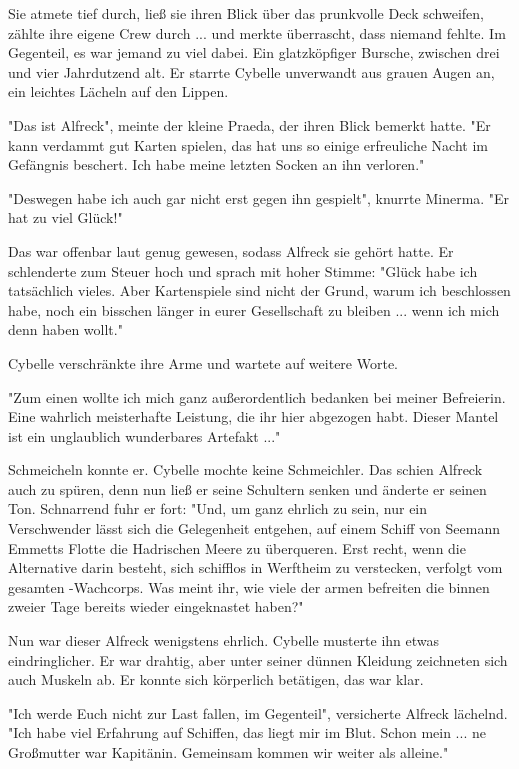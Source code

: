 Sie atmete tief durch, ließ sie ihren Blick über das prunkvolle Deck schweifen, zählte ihre eigene Crew durch ... und merkte überrascht, dass niemand fehlte. Im Gegenteil, es war jemand zu viel dabei.
Ein glatzköpfiger Bursche, zwischen drei und vier Jahrdutzend alt. Er starrte Cybelle unverwandt aus grauen Augen an, ein leichtes Lächeln auf den Lippen.

"Das ist Alfreck", meinte der kleine Praeda, der ihren Blick bemerkt hatte. "Er kann verdammt gut Karten spielen, das hat uns so einige erfreuliche Nacht im Gefängnis beschert. Ich habe meine letzten Socken an ihn verloren."

"Deswegen habe ich auch gar nicht erst gegen ihn gespielt", knurrte Minerma. "Er hat zu viel Glück!"

Das war offenbar laut genug gewesen, sodass Alfreck sie gehört hatte. Er schlenderte zum Steuer hoch und sprach mit hoher Stimme: "Glück habe ich tatsächlich vieles. Aber Kartenspiele sind nicht der Grund, warum ich beschlossen habe, noch ein bisschen länger in eurer Gesellschaft zu bleiben ... wenn ich mich denn haben wollt." 

Cybelle verschränkte ihre Arme und wartete auf weitere Worte.

"Zum einen wollte ich mich ganz außerordentlich bedanken bei meiner Befreierin. Eine wahrlich meisterhafte Leistung, die ihr hier abgezogen habt. Dieser Mantel ist ein unglaublich wunderbares Artefakt ..."

Schmeicheln konnte er. Cybelle mochte keine Schmeichler. Das schien Alfreck auch zu spüren, denn nun ließ er seine Schultern senken und änderte er seinen Ton. Schnarrend fuhr er fort: "Und, um ganz ehrlich zu sein, nur ein Verschwender lässt sich die Gelegenheit entgehen, auf einem Schiff von Seemann Emmetts Flotte die Hadrischen Meere zu überqueren. Erst recht, wenn die Alternative darin besteht, sich schifflos in Werftheim zu verstecken, verfolgt vom gesamten -Wachcorps. Was meint ihr, wie viele der armen befreiten  die  binnen zweier Tage bereits wieder eingeknastet haben?"

Nun war dieser Alfreck wenigstens ehrlich. Cybelle musterte ihn etwas eindringlicher. Er war drahtig, aber unter seiner dünnen Kleidung zeichneten sich auch Muskeln ab. Er konnte sich körperlich betätigen, das war klar.

"Ich werde Euch nicht zur Last fallen, im Gegenteil", versicherte Alfreck lächelnd. "Ich habe viel Erfahrung auf Schiffen, das liegt mir im Blut. Schon mein ... ne Großmutter war Kapitänin. Gemeinsam kommen wir weiter als alleine."


